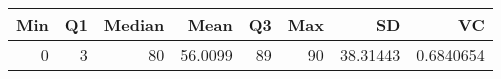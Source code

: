 
\begin{tabular}[t]{rrrrrrrr}
\toprule
Min & Q1 & Median & Mean & Q3 & Max & SD & VC\\
\midrule
0 & 3 & 80 & 56.0099 & 89 & 90 & 38.31443 & 0.6840654\\
\bottomrule
\end{tabular}